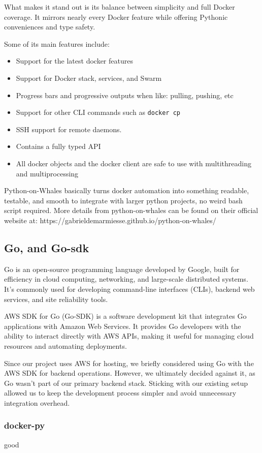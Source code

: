 \documentclass[12pt]{article}
\begin{document}
What makes it stand out is its balance between simplicity and full Docker coverage. 
It mirrors nearly every Docker feature while offering Pythonic conveniences and type safety.

Some of its main features include:
\begin{itemize}
\item Support for the latest docker features
\item Support for Docker stack, services, and Swarm
\item Progress bars and progressive outputs when like: pulling, pushing, etc
\item Support for other CLI commands such as \texttt{docker cp}
\item SSH support for remote daemons.
\item Contains a fully typed API
\item All docker objects and the docker client are safe to use with multithreading and multiprocessing
\end{itemize}
Python-on-Whales basically turns docker automation into something readable, testable, and smooth to
integrate with larger python projects, no weird bash script required.
More details from python-on-whales can be found on their official website at: https://gabrieldemarmiesse.github.io/python-on-whales/

\subsection{Go, and Go-sdk}
Go is an open-source programming language developed by Google, built for efficiency in cloud computing, networking, and large-scale distributed systems.
It’s commonly used for developing command-line interfaces (CLIs), backend web services, and site reliability tools.

AWS SDK for Go (Go-SDK) is a software development kit that integrates Go applications with Amazon Web Services.
It provides Go developers with the ability to interact directly with AWS APIs, making it useful for managing cloud resources and automating deployments.

Since our project uses AWS for hosting, we briefly considered using Go with the AWS SDK for backend operations.
However, we ultimately decided against it, as Go wasn’t part of our primary backend stack.
Sticking with our existing setup allowed us to keep the development process simpler and avoid unnecessary integration overhead.

\subsubsection{docker-py}
good
\end{document}
